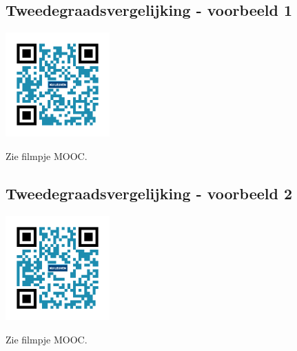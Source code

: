 



\subsection{Tweedegraadsvergelijking - voorbeeld 1}
\begin{minipage}{.25\linewidth}
	\raggedright
	\includegraphics[width=4cm]{2_elem_rekenvaardigheden_B/inputs/QR_Code_TWEEDEGRVGL1_module2}
\end{minipage}
\begin{minipage}{.7\linewidth}
	Zie filmpje MOOC.
\end{minipage}
\subsection{Tweedegraadsvergelijking - voorbeeld 2}
\begin{minipage}{.25\linewidth}
	\raggedright
	\includegraphics[width=4cm]{2_elem_rekenvaardigheden_B/inputs/QR_Code_TWEEDEGRVGL2_module2}
\end{minipage}
\begin{minipage}{.7\linewidth}
	Zie filmpje MOOC.
\end{minipage}
%
%









